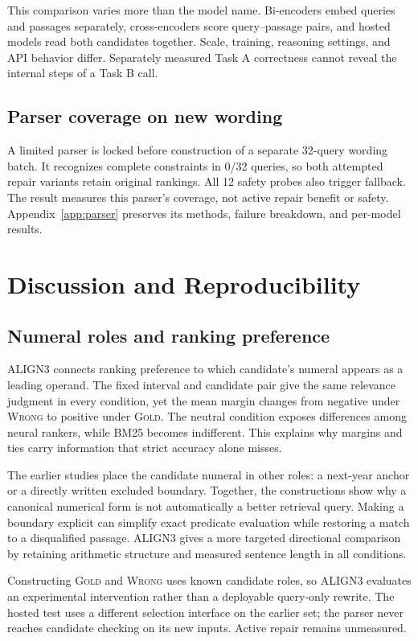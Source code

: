 \documentclass[conference,letterpaper]{IEEEtran}
\newcommand{\wrong}{\textsc{Wrong}}
\newcommand{\gold}{\textsc{Gold}}
\begin{document}
This comparison varies more than the model name. Bi-encoders embed queries and passages separately, cross-encoders score query--passage pairs, and hosted models read both candidates together. Scale, training, reasoning settings, and API behavior differ. Separately measured Task A correctness cannot reveal the internal steps of a Task B call.

\subsection{Parser coverage on new wording}
A limited parser is locked before construction of a separate 32-query wording batch. It recognizes complete constraints in 0/32 queries, so both attempted repair variants retain original rankings. All 12 safety probes also trigger fallback. The result measures this parser's coverage, not active repair benefit or safety. Appendix~\ref{app:parser} preserves its methods, failure breakdown, and per-model results.


\section{Discussion and Reproducibility}
\subsection{Numeral roles and ranking preference}
ALIGN3 connects ranking preference to which candidate's numeral appears as a leading operand. The fixed interval and candidate pair give the same relevance judgment in every condition, yet the mean margin changes from negative under \wrong{} to positive under \gold. The neutral condition exposes differences among neural rankers, while BM25 becomes indifferent. This explains why margins and ties carry information that strict accuracy alone misses.

The earlier studies place the candidate numeral in other roles: a next-year anchor or a directly written excluded boundary. Together, the constructions show why a canonical numerical form is not automatically a better retrieval query. Making a boundary explicit can simplify exact predicate evaluation while restoring a match to a disqualified passage. ALIGN3 gives a more targeted directional comparison by retaining arithmetic structure and measured sentence length in all conditions.

Constructing \gold{} and \wrong{} uses known candidate roles, so ALIGN3 evaluates an experimental intervention rather than a deployable query-only rewrite. The hosted test uses a different selection interface on the earlier set; the parser never reaches candidate checking on its new inputs. Active repair remains unmeasured.
\end{document}
